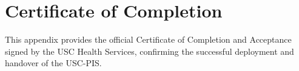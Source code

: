 
\chapter{Certificate of Completion}
\label{appendix:certificate_completion}

This appendix provides the official Certificate of Completion and Acceptance signed by the USC Health Services, confirming the successful deployment and handover of the USC-PIS.


